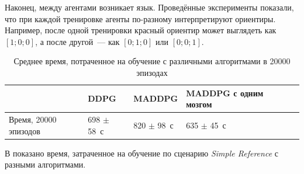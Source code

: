 Наконец, между агентами возникает язык. Проведённые эксперименты показали, что при каждой тренировке агенты по-разному интерпретируют ориентиры. Например, после одной тренировки красный ориентир может выглядеть как ${[1; 0; 0]}$, а после другой~--- как ${[0; 1; 0]}$ или ${[0; 0; 1]}$.

\begin{table}[t!]
    \centering\small
    \caption{Среднее время, потраченное на обучение с различными алгоритмами в 20000 эпизодах}
    \label{tab-sr-time}
    \begin{tabular}{|l|l|l|l|l|l|}
        \hline
        & DDPG           & MADDPG          & MADDPG с одним мозгом \\
        \hline
        Время, 20000 эпизодов & 698 $\pm$ 58~с & 820 $\pm$ 98~с & 635 $\pm$ 45~с       \\ \hline
    \end{tabular}
    \normalsize%
\end{table}

В  показано время, затраченное на обучение по сценарию \textit{Simple Reference} с разными алгоритмами.
